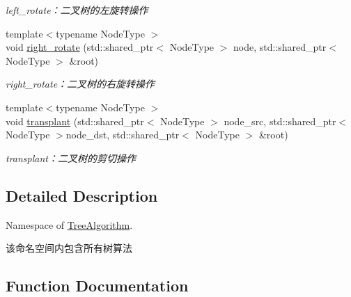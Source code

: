 \begin{DoxyCompactItemize}
\begin{DoxyCompactList}\small\item\em left\+\_\+rotate：二叉树的左旋转操作 \end{DoxyCompactList}\item 
{\footnotesize template$<$typename Node\+Type $>$ }\\void \hyperlink{namespace_introduction_to_algorithm_1_1_tree_algorithm_adeb83a10f8daa65c5cf5921737a04da0}{right\+\_\+rotate} (std\+::shared\+\_\+ptr$<$ Node\+Type $>$ node, std\+::shared\+\_\+ptr$<$ Node\+Type $>$ \&root)
\begin{DoxyCompactList}\small\item\em right\+\_\+rotate：二叉树的右旋转操作 \end{DoxyCompactList}\item 
{\footnotesize template$<$typename Node\+Type $>$ }\\void \hyperlink{namespace_introduction_to_algorithm_1_1_tree_algorithm_a4fb6d9c7d8b75a8d6ec4ee79fc0b1de5}{transplant} (std\+::shared\+\_\+ptr$<$ Node\+Type $>$ node\+\_\+src, std\+::shared\+\_\+ptr$<$ Node\+Type $>$node\+\_\+dst, std\+::shared\+\_\+ptr$<$ Node\+Type $>$ \&root)
\begin{DoxyCompactList}\small\item\em transplant：二叉树的剪切操作 \end{DoxyCompactList}\end{DoxyCompactItemize}


\subsection{Detailed Description}
Namespace of \hyperlink{namespace_introduction_to_algorithm_1_1_tree_algorithm}{Tree\+Algorithm}. 

该命名空间内包含所有树算法 

\subsection{Function Documentation}
\hypertarget{namespace_introduction_to_algorithm_1_1_tree_algorithm_abd9431ca8d1a40f70b6c72c732fc5892}{}
